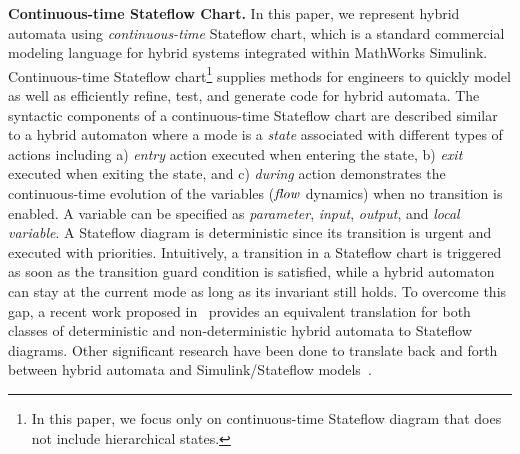 \vspace{0.5em}
\noindent
{\bf Continuous-time Stateflow Chart.}
%
In this paper, we represent hybrid automata using \emph{continuous-time} Stateflow chart, which is a standard commercial modeling language for hybrid systems integrated within MathWorks Simulink.
%
Continuous-time Stateflow chart\footnote{In this paper, we focus only on continuous-time Stateflow diagram that does not include hierarchical states.} supplies methods for engineers to quickly model as well as efficiently refine, test, and generate code for hybrid automata.
%
The syntactic components of a continuous-time Stateflow chart are described similar to a hybrid automaton where a mode is a \emph{state} associated with different types of actions including a) \emph{entry} action executed when entering the state, b) \emph{exit} executed when exiting the state, and c) \emph{during} action demonstrates the continuous-time evolution of the variables (\ie ${\mathit{flow}}$ dynamics) when no transition is enabled. A variable can be specified as \emph{parameter}, \emph{input}, \emph{output}, and \emph{local variable}. A Stateflow diagram is deterministic since its transition is urgent and executed with priorities.
%
Intuitively, a transition in a Stateflow chart is triggered as soon as the transition guard condition is satisfied, while a hybrid automaton can stay at the current mode as long as its invariant still holds.  To overcome this gap, a recent work proposed in~\cite{bak2017hybrid} provides an equivalent translation for both classes of deterministic and non-deterministic hybrid automata to Stateflow diagrams. Other significant research have been done to translate back and forth between hybrid automata and Simulink/Stateflow models~\cite{alur2008symbolic,manamcheri2011step,minopoli2016sl2sx}.

